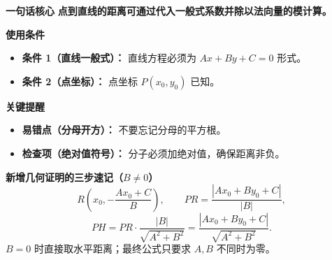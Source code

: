 \begin{summarybox}
	\textbf{\textcolor{CSummary}{一句话核心}}
	\textbf{点到直线的距离可通过代入一般式系数并除以法向量的模计算。}

	\medskip
	\textbf{\textcolor{CSummary}{使用条件}}
	\begin{itemize}[leftmargin=*, itemsep=0.5em, topsep=0.4em]
		\item \textbf{条件 1（直线一般式）：} 直线方程必须为 $Ax+By+C=0$ 形式。
		\item \textbf{条件 2（点坐标）：} 点坐标 $P(x_0,y_0)$ 已知。
	\end{itemize}

	\medskip
	\textbf{\textcolor{CSummary}{关键提醒}}
	\begin{itemize}[leftmargin=*, itemsep=0.5em, topsep=0.4em]
		\item \textbf{易错点（分母开方）：} 不要忘记分母的平方根。
		\item \textbf{检查项（绝对值符号）：} 分子必须加绝对值，确保距离非负。
	\end{itemize}


\medskip
\textbf{\textcolor{CSummary}{新增几何证明的三步速记（$B\ne0$）}}
\[
 R\left(x_0,-\frac{Ax_0+C}{B}\right),\qquad
 PR=\frac{|Ax_0+By_0+C|}{|B|},
\]
\[
 PH=PR\cdot\frac{|B|}{\sqrt{A^2+B^2}}
   =\frac{|Ax_0+By_0+C|}{\sqrt{A^2+B^2}}.
\]
$B=0$ 时直接取水平距离；最终公式只要求 $A,B$ 不同时为零。
\end{summarybox}
